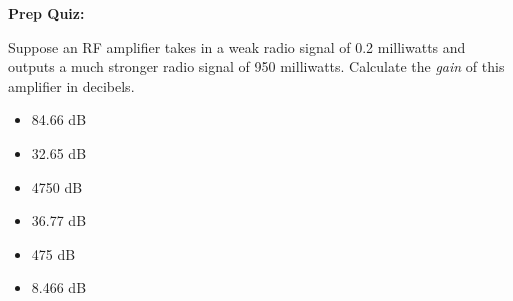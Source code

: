 \vfil \eject

\noindent
{\bf Prep Quiz:}

Suppose an RF amplifier takes in a weak radio signal of 0.2 milliwatts and outputs a much stronger radio signal of 950 milliwatts.  Calculate the {\it gain} of this amplifier in decibels.

\begin{itemize}
\item{} 84.66 dB
\vskip 5pt 
\item{} 32.65 dB
\vskip 5pt 
\item{} 4750 dB
\vskip 5pt 
\item{} 36.77 dB
\vskip 5pt 
\item{} 475 dB
\vskip 5pt 
\item{} 8.466 dB
\end{itemize}






